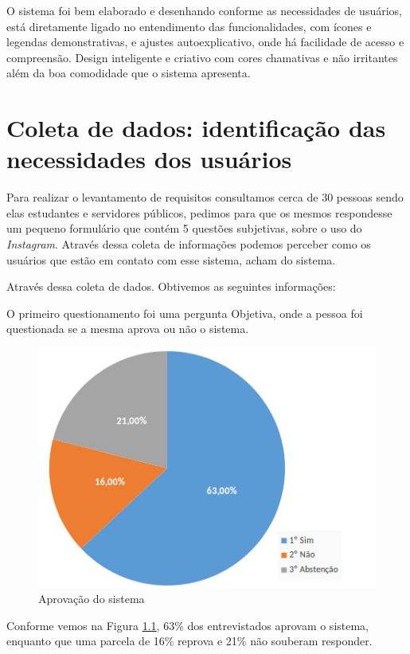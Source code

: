 \documentclass[
	12pt,				%
	openright,			%
	oneside,			%
	a4paper,			%
	english,			%
	french,				%
	spanish,			%
	brazil,				%
	]{abntex2}
\begin{document}
O sistema foi bem elaborado e desenhando conforme as necessidades de usuários, está diretamente ligado no entendimento das funcionalidades, com ícones e legendas demonstrativas, e ajustes autoexplicativo, onde há facilidade de acesso e compreensão. Design inteligente e criativo com cores chamativas e não irritantes além da boa comodidade que o sistema apresenta.

\chapter{Coleta de dados: identificação das necessidades dos usuários}

Para realizar o levantamento de requisitos consultamos cerca de 30 pessoas sendo elas estudantes e servidores públicos, pedimos para que os mesmos respondesse um pequeno formulário que contém 5 questões subjetivas, sobre o uso do \textit{Instagram}.
Através dessa coleta de informações podemos perceber como os usuários que estão em contato com esse sistema, acham do sistema.

Através dessa coleta de dados. Obtivemos as seguintes informações:

O primeiro questionamento foi uma pergunta Objetiva, onde a pessoa foi questionada se a mesma aprova ou não o sistema.

\begin{figure}[htb]
	\caption{\label{gr01}Aprovação do sistema}
	\begin{center}
		\includegraphics[scale=0.5]{graficos/01.jpg}
	\end{center}
\end{figure} 

Conforme vemos na Figura \ref{gr01}, 63\% dos entrevistados aprovam o sistema, enquanto que uma parcela de 16\% reprova e 21\% não souberam responder.
\end{document}
